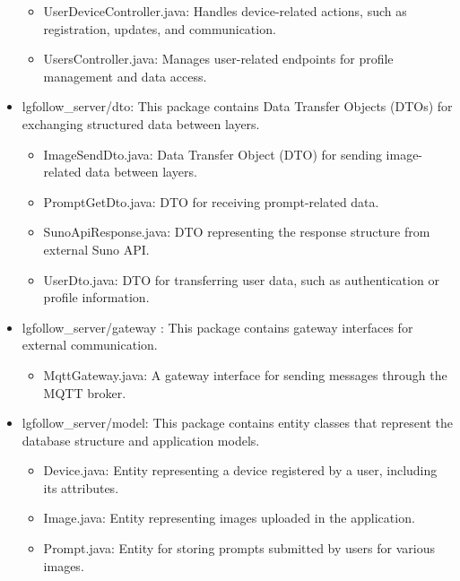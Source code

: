 \documentclass[conference]{IEEEtran}
\begin{document}
\begin{itemize}
\begin{itemize}
        \item UserDeviceController.java: Handles device-related actions, such as registration, updates, and communication. \\
        \item UsersController.java: Manages user-related endpoints for profile management and data access. \\
    \end{itemize}
    \item lgfollow\_server/dto: This package contains Data Transfer Objects (DTOs) for exchanging structured data between layers.
    \begin{itemize}
        \item ImageSendDto.java: Data Transfer Object (DTO) for sending image-related data between layers. \\
        \item PromptGetDto.java: DTO for receiving prompt-related data. \\
        \item SunoApiResponse.java: DTO representing the response structure from external Suno API. \\
        \item UserDto.java: DTO for transferring user data, such as authentication or profile information.
    \end{itemize}
    \item lgfollow\_server/gateway : This package contains gateway interfaces for external communication.
    \begin{itemize}
        \item MqttGateway.java: A gateway interface for sending messages through the MQTT broker. \\
    \end{itemize}
    \item lgfollow\_server/model: This package contains entity classes that represent the database structure and application models.
    \begin{itemize}
        \item Device.java: Entity representing a device registered by a user, including its attributes. \\
        \item Image.java: Entity representing images uploaded in the application. \\
        \item Prompt.java: Entity for storing prompts submitted by users for various images. \\

\end{itemize}
\end{itemize}
\end{document}
